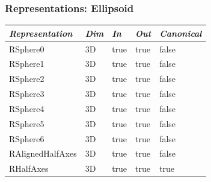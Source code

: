 \documentclass{beamer}
\begin{document}

\begin{frame}[fragile]
  \frametitle{Representations: Ellipsoid}
\centering
\begin{tabular}{lllll}
\textit{Representation} & \textit{Dim} & \textit{In} & \textit{Out} & \textit{Canonical} \\
\toprule
RSphere0         & 3D & true & true & false \\
RSphere1         & 3D & true & true & false \\
RSphere2         & 3D & true & true & false \\
RSphere3         & 3D & true & true & false \\
RSphere4         & 3D & true & true & false \\
RSphere5         & 3D & true & true & false \\
RSphere6         & 3D & true & true & false \\
RAlignedHalfAxes & 3D & true & true & false \\
RHalfAxes        & 3D & true & true & true
\end{tabular}
\end{frame}
\end{document}
